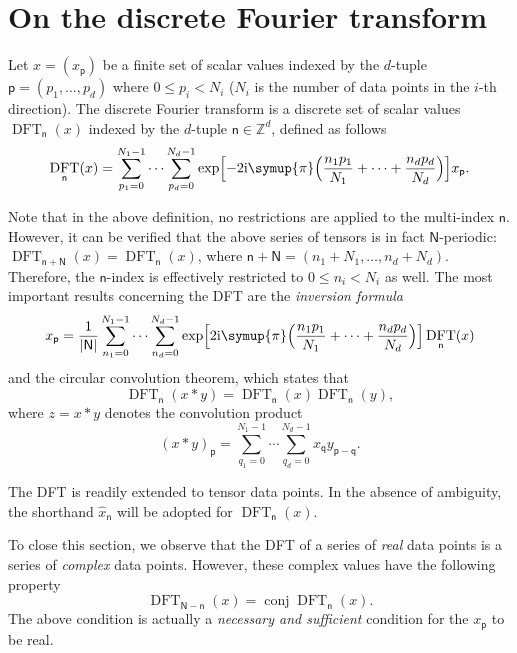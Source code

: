 \documentclass[draft, appendixprefix=true, chapterprefix=true, fontsize=12pt, numbers=noendperiod]{scrbook}
\DeclareMathOperator{\conj}{conj}
\DeclareMathOperator{\dft}{DFT}
\newcommand{\I}{\mathrm{i}}
\newcommand{\integers}{\mathbb{Z}}
\newcommand{\PI}{\symup{\pi}}
\newcommand{\tuple}[1]{\mathsf{#1}}
\begin{document}
\section{On the discrete Fourier transform}

Let \(x=(x_{\tuple{p}})\) be a finite set of scalar values indexed by the
\(d\)-tuple \(\tuple{p}=(p_1, \ldots, p_d)\) where \(0\leq p_i<N_i\) (\(N_i\)
is the number of data points in the \(i\)-th direction). The discrete Fourier
transform is a discrete set of scalar values \(\dft_{\tuple{n}}(x)\)
indexed by the \(d\)-tuple \(\tuple{n}\in\integers^d\), defined as follows
\begin{equation}
  \dft_{\tuple{n}}(x)=\sum_{p_1=0}^{N_1-1}\cdots\sum_{p_d=0}^{N_d-1}\exp
  \Bigl[-2\I\PI\Bigl(\frac{n_1p_1}{N_1}+\cdots+\frac{n_dp_d}{N_d}\Bigr)\Bigr]
  x_{\tuple{p}}.
\end{equation}

Note that in the above definition, no restrictions are applied to the
multi-index \(\tuple{n}\). However, it can be verified that the above series of
tensors is in fact \(\tuple{N}\)-periodic:
\(\dft_{\tuple{n}+\tuple{N}}(x)=\dft_{\tuple{n}}(x)\), where
\(\tuple{n}+\tuple{N}=(n_1+N_1, \ldots, n_d+N_d)\). Therefore, the
\(\tuple{n}\)-index is effectively restricted to \(0\leq n_i<N_i\) as well. The
most important results concerning the DFT are the \emph{inversion formula}
\begin{equation}
  x_{\tuple{p}}=\frac1{\lvert\tuple{N}\rvert}\sum_{n_1=0}^{N_1-1}\cdots
  \sum_{n_d=0}^{N_d-1}\exp\Bigl[2\I\PI\Bigl(\frac{n_1p_1}{N_1}+\cdots+
  \frac{n_dp_d}{N_d}\Bigr)\Bigr]\dft_{\tuple{n}}(x)
\end{equation}
and the circular convolution theorem, which states that
\begin{equation}
  \dft_{\tuple{n}}(x\ast y)=\dft_{\tuple{n}}(x)\dft_{\tuple{n}}(y),
\end{equation}
where \(z=x\ast y\) denotes the convolution product
\begin{equation}
  (x\ast y)_{\tuple p}=\sum_{q_1=0}^{N_1-1}\cdots\sum_{q_d=0}^{N_d-1}
  x_{\tuple{q}}y_{\tuple{p}-\tuple{q}}.
\end{equation}

The DFT is readily extended to tensor data points. In the absence of ambiguity,
the shorthand \(\hat{x}_{\tuple{n}}\) will be adopted for
\(\dft_{\tuple{n}}(x)\).

To close this section, we observe that the DFT of a series of \emph{real} data
points is a series of \emph{complex} data points. However, these complex values
have the following property
\begin{equation}
  \dft_{\tuple{N}-\tuple{n}}(x)=\conj\dft_{\tuple{n}}(x).
\end{equation}
The above condition is actually a \emph{necessary and sufficient} condition for
the \(x_{\tuple{p}}\) to be real.
\end{document}
